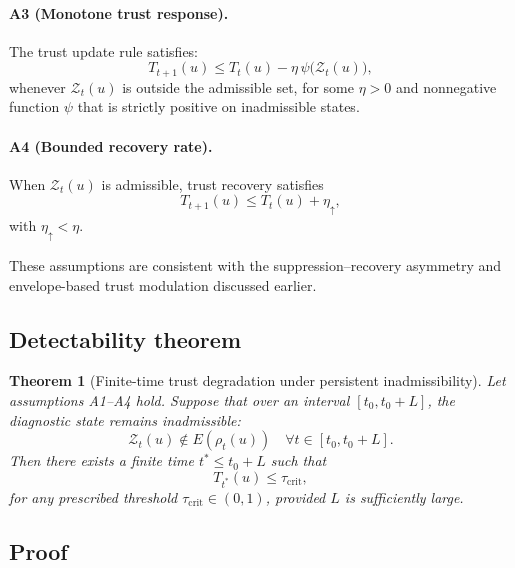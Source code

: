 \documentclass[11pt,letterpaper]{article}
\theoremstyle{gcresult}
\newtheorem{theorem}{Theorem}[section]
\theoremstyle{definition}
\begin{document}
\paragraph{A3 (Monotone trust response).}
The trust update rule satisfies:
\begin{equation}
T_{t+1}(u)\le T_t(u) - \eta\,\psi\!\bigl(\mathcal{Z}_t(u)\bigr),
\end{equation}
whenever $\mathcal{Z}_t(u)$ is outside the admissible set, for some $\eta>0$ and nonnegative function $\psi$ that is strictly positive on inadmissible states.

\paragraph{A4 (Bounded recovery rate).}
When $\mathcal{Z}_t(u)$ is admissible, trust recovery satisfies
\begin{equation}
T_{t+1}(u)\le T_t(u) + \eta_{\uparrow},
\end{equation}
with $\eta_{\uparrow}<\eta$.

These assumptions are consistent with the suppression–recovery asymmetry and envelope-based trust modulation discussed earlier.


\subsection{Detectability theorem}

\begin{theorem}[Finite-time trust degradation under persistent inadmissibility]
\label{thm:detectability}
Let assumptions A1–A4 hold. Suppose that over an interval $[t_0,t_0+L]$, the diagnostic state remains inadmissible:
\begin{equation}
\mathcal{Z}_t(u)\notin E(\rho_t(u)) \quad \forall t\in[t_0,t_0+L].
\end{equation}
Then there exists a finite time $t^\ast\le t_0+L$ such that
\begin{equation}
T_{t^\ast}(u)\le \tau_{\mathrm{crit}},
\end{equation}
for any prescribed threshold $\tau_{\mathrm{crit}}\in(0,1)$, provided $L$ is sufficiently large.
\end{theorem}


\subsection{Proof}
\end{document}
